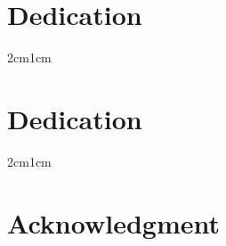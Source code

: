 \documentclass[12pt]{report}
\begin{document}
\clearpage
%
\chapter*{Dedication}
\begin{center}
\large
%


\end{center}


\begin{adjustwidth}{2cm}{1cm}
\hspace*{\fill} \textbf{\textit{\large }}
\end{adjustwidth}
%
\chapter*{Dedication}
\begin{center}
\large


\end{center}
\begin{adjustwidth}{2cm}{1cm}
\hspace*{\fill} \textbf{\textit{\large }}
\end{adjustwidth}


\chapter*{Acknowledgment}
\begin{center}
\it \normalsize  %
\end{center}

\bigskip
\medskip
\end{document}
